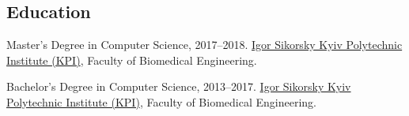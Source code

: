 \documentclass{hamsternik.cv}
\begin{document}

\subsection*{Education}

\begin{samepage}
Master's Degree in Computer Science, 2017--2018.
\newline \href{https://kpi.ua/en}{Igor Sikorsky Kyiv Polytechnic Institute (KPI)}, Faculty of Biomedical Engineering.

\vspace*{7px}

Bachelor's Degree in Computer Science, 2013--2017.
\newline \href{https://kpi.ua/en}{Igor Sikorsky Kyiv Polytechnic Institute (KPI)}, Faculty of Biomedical Engineering.
\end{samepage}
\end{document}
